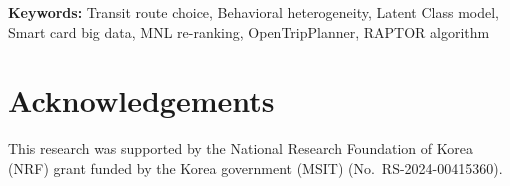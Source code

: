 \documentclass[12pt,a4paper]{article}
\begin{document}
\textbf{Keywords:} Transit route choice, Behavioral heterogeneity, Latent Class
model, Smart card big data, MNL re-ranking, OpenTripPlanner, RAPTOR algorithm








\section{Acknowledgements}

This research was supported by the National Research Foundation of Korea (NRF)
grant funded by the Korea government (MSIT) (No.\ RS-2024-00415360).

\end{document}
